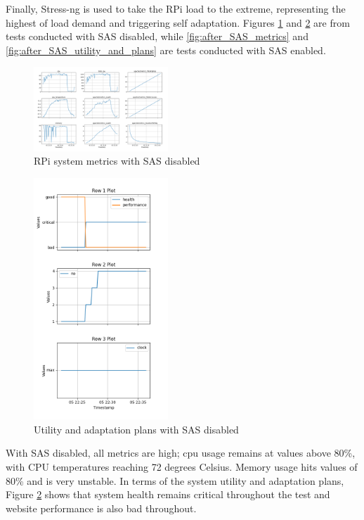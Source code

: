\documentclass[conference]{IEEEtran}
\begin{document}
Finally, Stress-ng is used to take the RPi load to the extreme, representing the highest of load demand and triggering self adaptation. Figures \ref{fig:before_SAS_metrics} and \ref{fig:before_SAS_utility_and_plans} are from tests conducted with SAS disabled, while \ref{fig:after_SAS_metrics} and \ref{fig:after_SAS_utility_and_plans} are tests conducted with SAS enabled.

\begin{figure}[H]
    \centering
    \includegraphics[width=0.45\textwidth]{./media/before_SAS_metrics.png}
    \caption{RPi system metrics with SAS disabled}
    \label{fig:before_SAS_metrics}
\end{figure}

\begin{figure}[H]
    \centering
    \includegraphics[width=0.45\textwidth]{./media/before_SAS_utility_and_plans.png}
    \caption{Utility and adaptation plans with SAS disabled}
    \label{fig:before_SAS_utility_and_plans}
\end{figure}

With SAS disabled, all metrics are high; cpu usage remains at values above 80\%, with CPU temperatures reaching 72 degrees Celsius. Memory usage hits values of 80\% and is very unstable. In terms of the system utility and adaptation plans, Figure \ref{fig:before_SAS_utility_and_plans} shows that system health remains critical throughout the test and website performance is also bad throughout.
\end{document}
